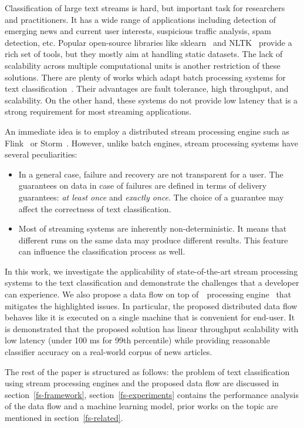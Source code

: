 \label {fs-short-intro}

Classification of large text streams is hard, but important task for researchers and practitioners. It has a wide range of applications including detection of emerging news and current user interests, suspicious traffic analysis, spam detection, etc. Popular open-source libraries like sklearn~\cite{sklearn_api} and NLTK~\cite{bird2009natural} provide a rich set of tools, but they mostly aim at handling static datasets. The lack of scalability across multiple computational units is another restriction of these solutions. There are plenty of works which adapt batch processing systems for text classification~\cite{semberecki2016distributed, svyatkovskiy2016large, baltas2016apache}. Their advantages are fault tolerance, high throughput, and scalability. On the other hand, these systems do not provide low latency that is a strong requirement for most streaming applications.

An immediate idea is to employ a distributed stream processing engine such as Flink~\cite{Carbone:2017:SMA:3137765.3137777} or Storm~\cite{apache:storm}. However, unlike batch engines, stream processing systems have several peculiarities: 

\begin{itemize}
    \item In a general case, failure and recovery are not transparent for a user. The guarantees on data in case of failures are defined in terms of delivery guarantees: {\em at least once} and {\em exactly once}. The choice of a guarantee may affect the correctness of text classification.
    \item Most of streaming systems are inherently non-deterministic. It means that different runs on the same data may produce different results. This feature can influence the classification process as well.
\end{itemize}

In this work, we investigate the applicability of state-of-the-art stream processing systems to the text classification and demonstrate the challenges that a developer can experience. We also propose a data flow on top of~\FlameStream\ processing engine~\cite{we2018beyondmr, we2018adbis} that mitigates the highlighted issues. In particular, the proposed distributed data flow behaves like it is executed on a single machine that is convenient for end-user. It is demonstrated that the proposed solution has linear throughput scalability with low latency (under 100 ms for 99th percentile) while providing reasonable classifier accuracy on a real-world corpus of news articles.

The rest of the paper is structured as follows: the problem of text classification using stream processing engines and the proposed data flow are discussed in section~\ref{fs-framework}, section~\ref{fs-experiments} contains the performance analysis of the data flow and a machine learning model, prior works on the topic are mentioned in section~\ref{fs-related}.
